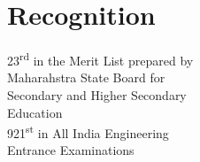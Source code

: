 \documentclass[letterpaper]{deedy-resume} %
\begin{document}
\begin{minipage}[t]{0.25\textwidth}
\section{Recognition}
\textbullet{} 23\textsuperscript{rd} in the Merit List prepared by \\ \hphantom{\textbullet{}} Maharahstra State Board for \\ \hphantom{\textbullet{}} Secondary and Higher Secondary \\ \hphantom{\textbullet{}} Education\\
\textbullet{} 921\textsuperscript{st} in All India Engineering \\ \hphantom{\textbullet{}} Entrance Examinations \\
\hfill
\end{minipage} %
%
\end{document}
